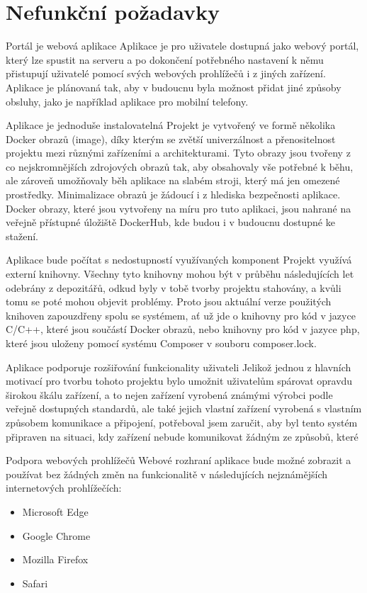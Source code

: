 \section{Nefunkční požadavky}

\def\myprefix{N}
\begin{enumfunctional}[style=nextline]
\item[Portál je webová aplikace]
Aplikace je pro uživatele dostupná jako webový portál, který lze spustit na serveru a po dokončení potřebného nastavení k němu přistupují uživatelé pomocí svých webových prohlížečů i z jiných zařízení. Aplikace je plánovaná tak, aby v budoucnu byla možnost přidat jiné způsoby obsluhy, jako je například aplikace pro mobilní telefony.
\item[Aplikace je jednoduše instalovatelná]
Projekt je vytvořený ve formě několika Docker obrazů (image), díky kterým se zvětší univerzálnost a přenositelnost projektu mezi různými zařízeními a architekturami. Tyto obrazy jsou tvořeny z co nejskromnějších zdrojových obrazů tak, aby obsahovaly vše potřebné k běhu, ale zároveň umožňovaly běh aplikace na slabém stroji, který má jen omezené prostředky. Minimalizace obrazů je žádoucí i z hlediska bezpečnosti aplikace. Docker obrazy, které jsou vytvořeny na míru pro tuto aplikaci, jsou nahrané na veřejně přístupné úložiště DockerHub, kde budou i v budoucnu dostupné ke stažení.
\item[Aplikace bude počítat s nedostupností využívaných komponent]
Projekt využívá externí knihovny. Všechny tyto knihovny mohou být v průběhu následujících let odebrány z depozitářů, odkud byly v tobě tvorby projektu stahovány, a kvůli tomu se poté mohou objevit problémy. Proto jsou aktuální verze použitých knihoven zapouzdřeny spolu se systémem, ať už jde o knihovny pro kód v jazyce C/C++, které jsou součástí Docker obrazů, nebo knihovny pro kód v jazyce \acrshort{php}, které jsou uloženy pomocí systému Composer v souboru composer.lock.
\item[Aplikace podporuje rozšiřování funkcionality uživateli]
Jelikož jednou z hlavních motivací pro tvorbu tohoto projektu bylo umožnit uživatelům spárovat opravdu širokou škálu zařízení, a to nejen zařízení vyrobená známými výrobci podle veřejně dostupných standardů, ale také jejich vlastní zařízení vyrobená s vlastním způsobem komunikace a připojení, potřeboval jsem zaručit, aby byl tento systém připraven na situaci, kdy zařízení nebude komunikovat žádným ze způsobů, které 
\item[Podpora webových prohlížečů]
Webové rozhraní aplikace bude možné zobrazit a používat bez žádných změn na funkcionalitě v následujících nejznámějších internetových prohlížečích:
\begin{itemize}
\item{Microsoft Edge}
\item{Google Chrome}
\item{Mozilla Firefox}
\item{Safari}
\end{itemize}
\end{enumfunctional}


